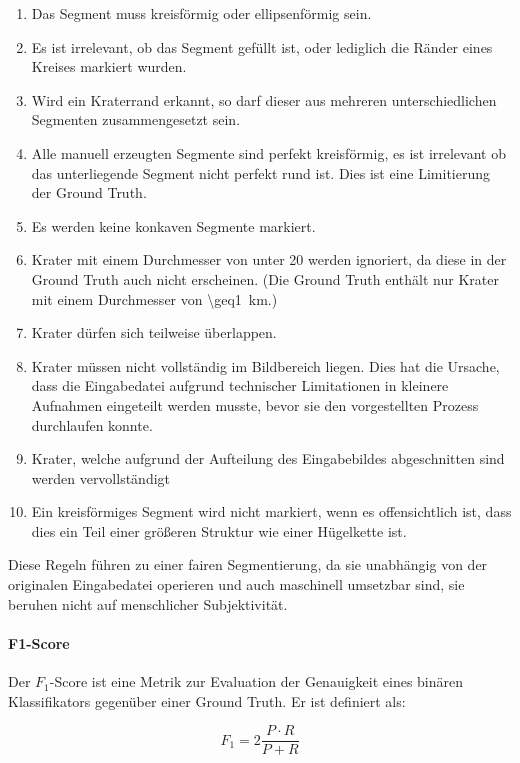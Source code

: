 \begin{enumerate}
	\item Das Segment muss kreisförmig oder ellipsenförmig sein.
	\item Es ist irrelevant, ob das Segment gefüllt ist, oder lediglich die Ränder eines Kreises markiert wurden.
	\item Wird ein Kraterrand erkannt, so darf dieser aus mehreren unterschiedlichen Segmenten zusammengesetzt sein.
	\item Alle manuell erzeugten Segmente sind perfekt kreisförmig, es ist irrelevant ob das unterliegende Segment nicht perfekt rund ist. Dies ist eine Limitierung der Ground Truth.
	\item Es werden keine konkaven Segmente markiert.
	\item Krater mit einem Durchmesser von unter \SI{20}{\pixel} werden ignoriert, da diese in der Ground Truth auch nicht erscheinen. (Die Ground Truth enthält nur Krater mit einem Durchmesser von \SI{\geq1}{\kilo\meter}.)
	\item Krater dürfen sich teilweise überlappen.
	\item Krater müssen nicht vollständig im Bildbereich liegen. Dies hat die Ursache, dass die Eingabedatei aufgrund technischer Limitationen in kleinere Aufnahmen eingeteilt werden musste, bevor sie den vorgestellten Prozess durchlaufen konnte.
	\item Krater, welche aufgrund der Aufteilung des Eingabebildes abgeschnitten sind werden vervollständigt
	\item Ein kreisförmiges Segment wird nicht markiert, wenn es offensichtlich ist, dass dies ein Teil einer größeren Struktur wie einer Hügelkette ist.
\end{enumerate}

Diese Regeln führen zu einer fairen Segmentierung, da sie unabhängig von der originalen Eingabedatei operieren und auch maschinell umsetzbar sind, \dahe sie beruhen nicht auf menschlicher Subjektivität.

\paragraph{F1-Score}

Der $F_1$-Score ist eine Metrik zur Evaluation der Genauigkeit eines binären Klassifikators gegenüber einer Ground Truth. Er ist definiert als: \cite{chinchor_92}

\begin{equation}
F_1 = 2\frac{P\cdot R}{P+R}
\end{equation}

